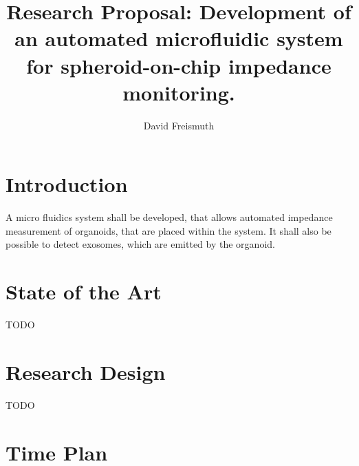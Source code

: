 \usepackage{cite}
\usepackage{pgfgantt}
\usepackage{pdflscape}
\usepackage{geometry}
\usepackage{cleveref}


\newcommand{\myWeek}{\themyWeekNum
    \stepcounter{myWeekNum}
    \ifnum\themyWeekNum=53
    \setcounter{myWeekNum}{1}
    \else\fi
}



\setcounter{myWeekNum}{39}
\title{Research Proposal: Development of an automated microfluidic system for spheroid-on-chip impedance monitoring.}
\author{David Freismuth}

\maketitle

 
\section{Introduction}
A micro fluidics system shall be developed, that allows automated impedance measurement of organoids, that are placed within the system. It shall also be possible to detect exosomes, which are emitted by the organoid.

\section{State of the Art}
TODO
\section{Research Design}
TODO
\section{Time Plan}

